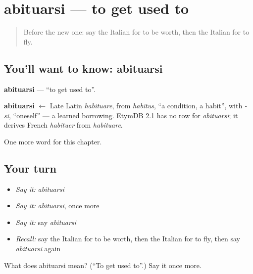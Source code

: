\section[abituarsi]{abituarsi — to get used to}

\label{lesson:IT-C182-abituarsi}



\begin{quote}
Before the new one: say the Italian for to be worth, then the Italian for to fly.
\end{quote}

\subsection*{You'll want to know: abituarsi}
\textbf{abituarsi} — \textquotedblleft{}to get used to\textquotedblright{}.

\begin{cousinweb}
\textbf{abituarsi} $\leftarrow$ Late Latin \emph{habituare}, from \emph{habitus}, \textquotedblleft{}a condition, a habit\textquotedblright{}, with \emph{-si}, \textquotedblleft{}oneself\textquotedblright{} — a learned borrowing. EtymDB 2.1 has no row for \emph{abituarsi}; it derives French \emph{habituer} from \emph{habituare}.
\end{cousinweb}

\begin{grammarlens}[title={What you've built}]
One more word for this chapter.
\end{grammarlens}

\subsection*{Your turn}
\begin{itemize}
\raggedright
  \item \emph{Say it:} \emph{abituarsi}
  \item \emph{Say it:} \emph{abituarsi}, once more
  \item \emph{Say it:} say \emph{abituarsi}
  \item \emph{Recall:} say the Italian for to be worth, then the Italian for to fly, then say \emph{abituarsi} again
\end{itemize}

\begin{tcolorbox}[breakable,colback=teal!4,colframe=teal!35!black,title={Before you move on}]
What does abituarsi mean? (\textquotedblleft{}To get used to\textquotedblright{}.) Say it once more.
\end{tcolorbox}
